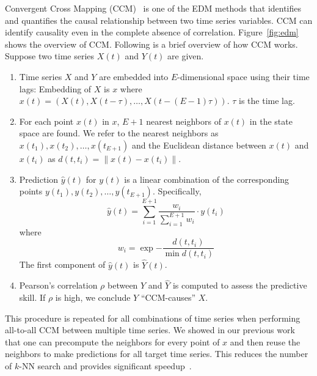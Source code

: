 \documentclass[conference]{IEEEtran}
\begin{document}
Convergent Cross Mapping (CCM)~\cite{Sugihara2012} is one of the EDM methods
that identifies and quantifies the causal relationship between two time series
variables. CCM can identify causality even in the complete absence of
correlation. Figure~\ref{fig:edm} shows the overview of CCM\@. Following is a
brief overview of how CCM works. Suppose two time series $X(t)$ and $Y(t)$ are
given.

\begin{enumerate}
    \item Time series $X$ and $Y$ are embedded into $E$-dimensional space
        using their time lags: Embedding of $X$ is $x$ where $x(t)=\left(X(t),
        X(t-\tau), \dots, X(t-(E-1) \tau)\right)$. $\tau$ is the time lag.
    \item For each point $x(t)$ in $x$, $E+1$ nearest neighbors of $x(t)$ in
        the state space are found. We refer to the nearest neighbors as
        $x(t_1), x(t_2), \dots, x(t_{E+1})$ and the Euclidean distance between
        $x(t)$ and $x(t_i)$ as $d(t, t_i)=\lVert x(t) - x(t_i) \rVert$.
    \item Prediction $\hat{y}(t)$ for $y(t)$ is a linear combination of
        the corresponding points $y(t_1), y(t_2), \dots, y(t_{E+1})$.
        Specifically,
        \begin{equation*}
            \hat{y}(t) = \sum^{E+1}_{i=1} \frac{w_i}{\sum^{E+1}_{i=1}{w_i}} \cdot y(t_i)
        \end{equation*}
        where
        \begin{equation*}
            w_i = \exp{-\frac{d(t, t_i)}{\min{d(t, t_i)}}}
        \end{equation*}
        The first component of $\hat{y}(t)$ is $\hat{Y}(t)$.
    \item Pearson's correlation $\rho$ between $Y$ and $\hat{Y}$ is computed
        to assess the predictive skill. If $\rho$ is high, we conclude $Y$
        ``CCM-causes'' $X$.
\end{enumerate}

This procedure is repeated for all combinations of time series when performing
all-to-all CCM between multiple time series. We showed in our previous
work~\cite{mpedm} that one can precompute the neighbors for every point of $x$
and then reuse the neighbors to make predictions for all target time series.
This reduces the number of $k$-NN search and provides significant
speedup~\cite{mpedm}.

~\cite{Natsukawa2017,VanBerkel2020}
\end{document}
